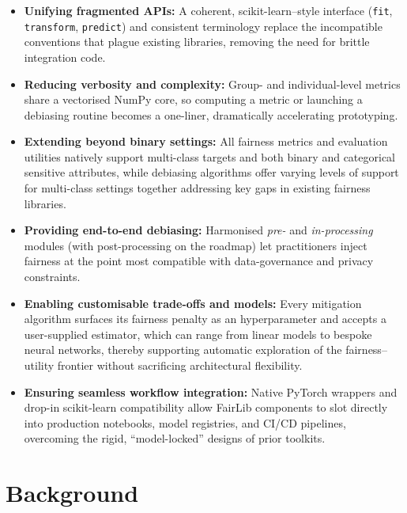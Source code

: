 \documentclass[12pt,a4paper,openright,twoside]{book}
\begin{document}
\begin{itemize}
  \item \textbf{Unifying fragmented APIs:}  
  A coherent, scikit-learn–style interface
  (\texttt{fit}, \texttt{transform}, \texttt{predict}) and consistent terminology
  replace the incompatible conventions that plague existing libraries,
  removing the need for brittle integration code.

  \item \textbf{Reducing verbosity and complexity:}  
  Group- and individual-level metrics share a vectorised NumPy core, so
  computing a metric or launching a debiasing routine becomes a one-liner,
  dramatically accelerating prototyping.

  \item \textbf{Extending beyond binary settings:}  
  All fairness metrics and evaluation utilities natively support multi-class targets and both binary and categorical sensitive attributes, while debiasing algorithms offer varying levels of support for multi-class settings together addressing key gaps in existing fairness libraries.

  \item \textbf{Providing end-to-end debiasing:}  
  Harmonised \emph{pre-} and \emph{in-processing} modules (with
  post-processing on the roadmap) let practitioners inject fairness at the
  point most compatible with data-governance and privacy constraints.

  \item \textbf{Enabling customisable trade-offs and models:}  
  Every mitigation algorithm surfaces its fairness penalty as an hyperparameter and accepts a user-supplied estimator, which can range from linear models to bespoke neural networks, thereby supporting automatic exploration of the fairness–utility frontier without sacrificing architectural flexibility.

  \item \textbf{Ensuring seamless workflow integration:}  
  Native PyTorch wrappers and drop-in scikit-learn compatibility allow FairLib components to slot directly into production notebooks, model registries, and CI/CD pipelines, overcoming the rigid, “model-locked” designs of prior toolkits.
\end{itemize}



\chapter{Background}
\end{document}
